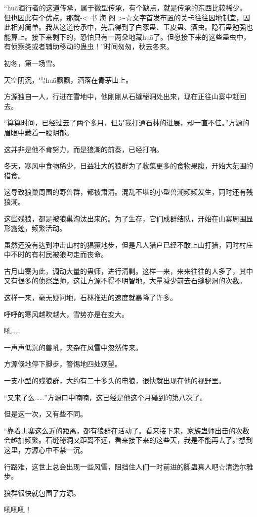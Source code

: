 \begin{this_body}
“huā酒行者的这道传承，属于微型传承，有个缺点，就是传承的东西比较稀少。但也因此有个优点，那就-< 书 海 阁 >-☆文字首发布置的关卡往往因地制宜，因此相对简单。我从这道传承中，先后得到了白豕蛊、玉皮蛊、酒虫。隐石蛊勉强也能算上。接下来剩下的，恐怕只有一两朵地藏huā了。但愿接下来的这些蛊虫中，有侦察类或者辅助移动的蛊虫！”时间匆匆，秋去冬来。

初冬，第一场雪。

天空阴沉，雪huā飘飘，洒落在青茅山上。

方源独自一人，行进在雪地中，他刚刚从石缝秘洞处出来，现在正往山寨中赶回去。

“算算时间，已经过去了两个多月，但是我打通石林的进展，却一直不佳。”方源的眉眼中藏着一股阴郁。

这并非是他不肯努力，而是狼潮的前奏，已经打响。

冬天，寒风中食物稀少，日益壮大的狼群为了收集更多的食物果腹，开始大范围的猎食。

这导致狼巢周围的野兽群，都被肃清。混乱不堪的小型兽潮频频发生，同时还有残狼潮。

这些残狼，都是被狼巢淘汰出来的。为了生存，它们成群结队，开始在山寨周围显形露迹，频繁活动。

虽然还没有达到冲击山村的猖獗地步，但是凡人猎户已经不敢上山打猎，同时村庄中不时的有村民被狼叼走而丧命。

古月山寨为此，调动大量的蛊师，进行清剿。这样一来，来来往往的人多了，其中又有很多的侦察蛊师，这让方源不得不明智地，大量减少前去石缝秘洞的次数。

这样一来，毫无疑问地，石林推进的速度就暴降了许多。

呼呼的寒风越吹越大，雪势亦是在变大。

吼……

一声声低沉的兽吼，夹杂在风雪中忽然传来。

方源倏地停下脚步，警惕地四处观望。

一支小型的残狼群，大约有二十多头的电狼，很快就出现在他的视野里。

“又来了么……”方源口中喃喃，这已经是他这个月碰到的第八次了。

但是这一次，又有些不同。

“靠着山寨这么近的距离，都有狼群在活动了。看来接下来，家族蛊师出击的次数会越加频繁。石缝秘洞又距离不远，看来接下来的这些天，我是不能再去了。”想到这里，方源心中不禁一沉。

行路难，这世上总会出现一些风雪，阻挡住人们一时前进的脚蛊真人吧☆清逸尔雅步。

狼群很快就包围了方源。

吼吼吼！


\end{this_body}
